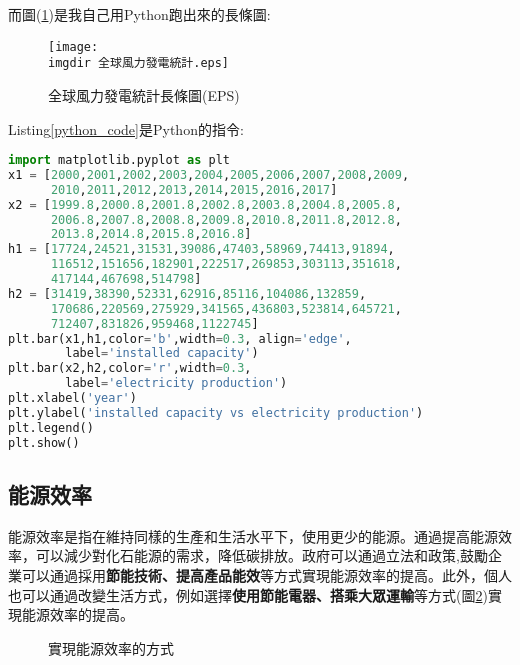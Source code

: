 \documentclass[12pt, a4paper]{article}
\begin{document}
而圖(\ref{fig:wind_python_eps})是我自己用Python跑出來的長條圖:
\begin{figure}[hb]
  \centering
  \texttt{[image: \\imgdir 全球風力發電統計.eps]}
  \caption{全球風力發電統計長條圖(EPS)}\label{fig:wind_python_eps}
\vspace{2cm}
\end{figure}


Listing\ref{python_code}是Python的指令:

\begin{lstlisting}[language=Python, caption=Python code, label=python_code]
import matplotlib.pyplot as plt
x1 = [2000,2001,2002,2003,2004,2005,2006,2007,2008,2009,
      2010,2011,2012,2013,2014,2015,2016,2017]
x2 = [1999.8,2000.8,2001.8,2002.8,2003.8,2004.8,2005.8,
      2006.8,2007.8,2008.8,2009.8,2010.8,2011.8,2012.8,
      2013.8,2014.8,2015.8,2016.8]   
h1 = [17724,24521,31531,39086,47403,58969,74413,91894,
      116512,151656,182901,222517,269853,303113,351618,
      417144,467698,514798]
h2 = [31419,38390,52331,62916,85116,104086,132859,
      170686,220569,275929,341565,436803,523814,645721,
      712407,831826,959468,1122745]
plt.bar(x1,h1,color='b',width=0.3, align='edge',
        label='installed capacity')
plt.bar(x2,h2,color='r',width=0.3,
        label='electricity production')
plt.xlabel('year')
plt.ylabel('installed capacity vs electricity production')
plt.legend()
plt.show()
\end{lstlisting}



\subsection{能源效率}
能源效率是指在維持同樣的生產和生活水平下，使用更少的能源。通過提高能源效率，可以減少對化石能源的需求，降低碳排放。政府可以通過立法和政策,鼓勵企業可以通過採用\textbf{\BB 節能技術、提高產品能效}等方式實現能源效率的提高。此外，個人也可以通過改變生活方式，例如選擇\textbf{\BB 使用節能電器、搭乘大眾運輸}等方式(圖\ref{fig:energy_efficiency})實現能源效率的提高。

\begin{figure}[h]
    \centering
    \hspace{0.5cm}
    \caption{實現能源效率的方式}\label{fig:energy_efficiency}
\end{figure}
\end{document}
